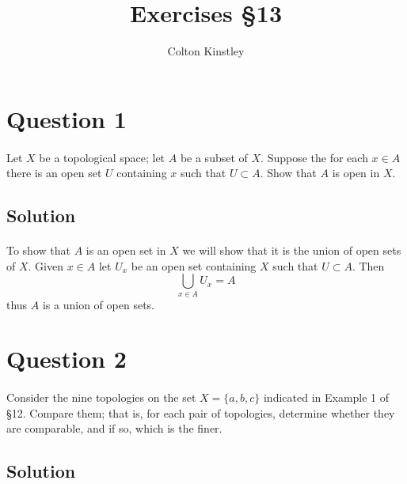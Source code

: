 \documentclass[11pt, oneside]{article}   	%
\title{Exercises \S13}
\author{Colton Kinstley}
\begin{document}
\maketitle





\section*{Question 1}
\paragraph{}

Let $X$ be a topological space; let $A$ be a subset of $X$. Suppose the for each $x \in A$ there is an open set $U$ containing $x$ such that $U \subset A $. Show that $A$ is open in $X$.


\subsection*{Solution}
\paragraph{}

To show that $A$ is an open set in $X$ we will show that it is the union of open sets of $X$. Given $x \in  A$ let $U_x$ be an open set containing $X$ such that $U \subset A$. Then
\[
\bigcup_{x \in A} U_x = A
\]
thus $A$ is a union of open sets.



\section*{Question 2}
\paragraph{}

Consider the nine topologies on the set $X = \{a,b,c\}$ indicated in Example 1 of \S12. Compare them; that is, for each pair of topologies, determine whether they are comparable, and if so, which is the finer.

\subsection*{Solution}
\paragraph{}
\end{document}
